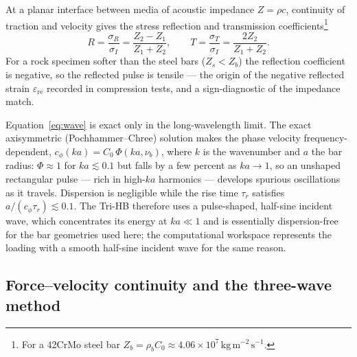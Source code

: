 \documentclass[11pt]{article}
\newcommand{\Cz}{C_{0}}
\newcommand{\eps}{\varepsilon}
\begin{document}
At a planar interface between media of acoustic impedance $Z=\rho c$, continuity
of traction and velocity gives the stress reflection and transmission
coefficients\footnote{For a 42CrMo steel bar
$Z_b=\rho_b\Cz\approx4.06\times10^{7}\,\mathrm{kg\,m^{-2}\,s^{-1}}$.}
\begin{equation}
R=\frac{\sigma_R}{\sigma_I}=\frac{Z_2-Z_1}{Z_1+Z_2},\qquad
T=\frac{\sigma_T}{\sigma_I}=\frac{2Z_2}{Z_1+Z_2}.
\label{eq:fresnel}
\end{equation}
For a rock specimen softer than the steel bars ($Z_s<Z_b$) the reflection
coefficient is negative, so the reflected pulse is tensile --- the origin of the
negative reflected strain $\eps_{\mathrm{re}}$ recorded in compression tests, and
a sign-diagnostic of the impedance match.

Equation~\eqref{eq:wave} is exact only in the long-wavelength limit. The exact
axisymmetric (Pochhammer--Chree) solution makes the phase velocity
frequency-dependent, $c_\phi(ka)=\Cz\,\Phi(ka,\nu_b)$, where $k$ is the wavenumber
and $a$ the bar radius: $\Phi\approx1$ for $ka\lesssim0.1$ but falls by a few
percent as $ka\to1$, so an unshaped rectangular pulse --- rich in high-$ka$
harmonics --- develops spurious oscillations as it travels. Dispersion is
negligible while the rise time $\tau_r$ satisfies $a/(c_\phi\tau_r)\lesssim0.1$.
The Tri-HB therefore uses a pulse-shaped, half-sine incident wave, which
concentrates its energy at $ka\ll1$ and is essentially dispersion-free for the
bar geometries used here; the computational workspace represents the loading with
a smooth half-sine incident wave for the same reason.

\subsection{Force--velocity continuity and the three-wave method}
\end{document}
